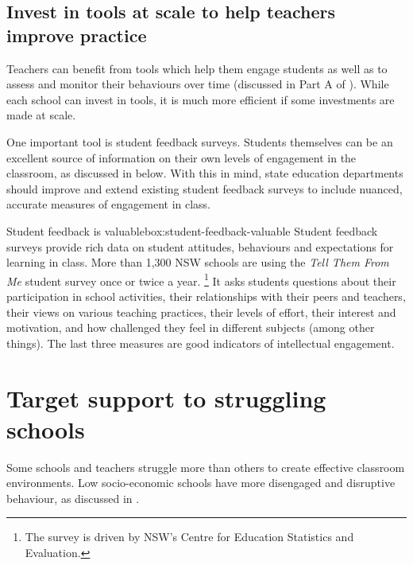 \documentclass{grattan}
\begin{document}
\subsection{Invest in tools at scale to help teachers improve practice}\label{subsec:invest-in-tools}
Teachers can benefit from tools which help them engage students as well as to assess and monitor their behaviours over time (discussed in Part A of ).
While each school can invest in tools, it is much more efficient if some investments are made at scale.

One important tool is student feedback surveys. Students themselves can be an excellent source of information on their own levels of engagement in the classroom, as discussed in
 below.
With this in mind, state education departments should improve and extend existing student feedback surveys to include nuanced, accurate measures of engagement in class.

\setlength{\intextsep}{1.25\baselineskip plus 0.5\baselineskip}\oneraggedpage

\begin{verysmallbox}[!h]{Student feedback is valuable}{box:student-feedback-valuable}%
Student feedback surveys provide rich data on student attitudes, behaviours and expectations for learning in class. More than 1,300 NSW schools are using the \emph{Tell Them From Me} student survey once or twice a year.%
    \footnote{The survey is driven by NSW's Centre for Education Statistics and Evaluation.}
It asks students questions  about their participation in school activities, their relationships with their peers and teachers, their views on various teaching practices, their levels of effort, their interest and motivation, and how challenged they feel in different subjects (among other things). The last three measures are good indicators of intellectual engagement.

\end{verysmallbox}
%
%
%
\section{Target support to struggling schools }\label{sec:target-support-struggling-schools}
Some schools and teachers struggle more than others to create effective classroom environments. Low socio-economic schools have more disengaged and disruptive behaviour, as discussed in .
\end{document}
